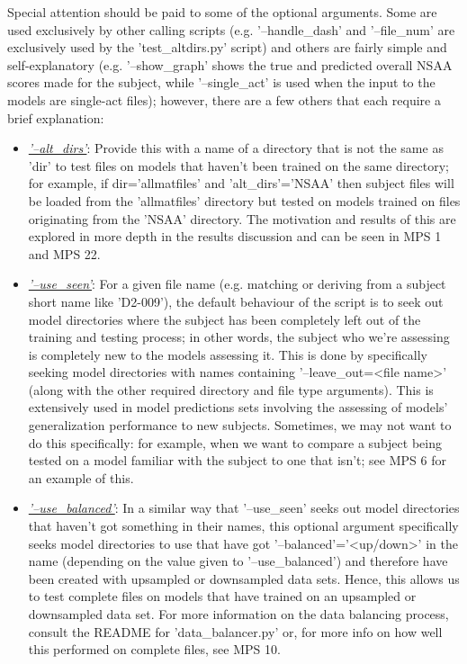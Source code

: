 \documentclass[12pt,twoside]{report}
\begin{document}
\quad Special attention should be paid to some of the optional arguments. Some are used exclusively by other calling scripts (e.g. '--handle\_dash' and '--file\_num' are exclusively used by the 'test\_altdirs.py' script) and others are fairly simple and self-explanatory (e.g. '--show\_graph' shows the true and predicted overall NSAA scores made for the subject, while '--single\_act' is used when the input to the models are single-act files); however, there are a few others that each require a brief explanation:

\begin{itemize}
	\item \underline{\textit{'--alt\_dirs'}}: Provide this with a name of a directory that is not the same as 'dir' to test files on models that haven't been trained on the same directory; for example, if dir='allmatfiles' and 'alt\_dirs'='NSAA' then subject files will be loaded from the 'allmatfiles' directory but tested on models trained on files originating from the 'NSAA' directory. The motivation and results of this are explored in more depth in the results discussion and can be seen in MPS 1 and MPS 22.
	\item \underline{\textit{'--use\_seen'}}: For a given file name (e.g. matching or deriving from a subject short name like 'D2-009'), the default behaviour of the script is to seek out model directories where the subject has been completely left out of the training and testing process; in other words, the subject who we're assessing is completely new to the models assessing it. This is done by specifically seeking model directories with names containing '--leave\_out=<file name>' (along with the other required directory and file type arguments). This is extensively used in model predictions sets involving the assessing of models’ generalization performance to new subjects. Sometimes, we may not want to do this specifically: for example, when we want to compare a subject being tested on a model familiar with the subject to one that isn't; see MPS 6 for an example of this.
	\item \underline{\textit{'--use\_balanced'}}: In a similar way that '--use\_seen' seeks out model directories that haven't got something in their names, this optional argument specifically seeks model directories to use that have got '--balanced'='<up/down>' in the name (depending on the value given to '--use\_balanced') and therefore have been created with upsampled or downsampled data sets. Hence, this allows us to test complete files on models that have trained on an upsampled or downsampled data set. For more information on the data balancing process, consult the README for 'data\_balancer.py' or, for more info on how well this performed on complete files, see MPS 10.
\end{itemize}
\end{document}
